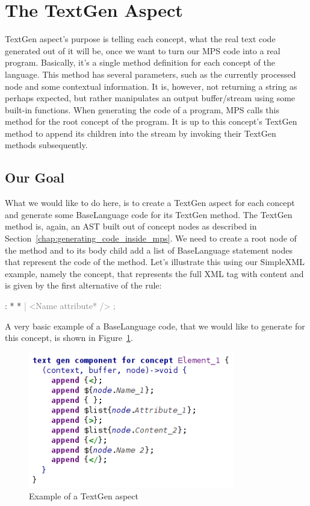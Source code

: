 \section{The TextGen Aspect}
\label{chap:textgen}

TextGen aspect's purpose is telling each concept, what the real text code generated out of it will be, once we want to turn our MPS code into a real program.
Basically, it's a single method definition for each concept of the language.
This method has several parameters, such as the currently processed node and some contextual information.
It is, however, not returning a string as perhaps expected, but rather manipulates an output buffer/stream using some built-in functions.
When generating the code of a program, MPS calls this method for the root concept of the program.
It is up to this concept's TextGen method to append its children into the stream by invoking their TextGen methods subsequently.

\subsection{Our Goal}

What we would like to do here, is to create a TextGen aspect for each concept and generate some BaseLanguage code for its TextGen method.
The TextGen method is, again, an AST built out of concept nodes as described in Section~\ref{chap:generating_code_inside_mps}.
We need to create a root node of the method and to its body child add a list of BaseLanguage statement nodes that represent the code of the method.
Let's illustrate this using our SimpleXML example, namely the  concept, that represents the full XML tag with content and is given by the first alternative of the  rule:

\begin{antlr}
	   :   \literal{<}  * \literal{>} * \literal{</}  \literal{>}
          \textcolor{gray}{|   \ap<\ap Name attribute* \ap/>\ap}
          \textcolor{gray}{;}
\end{antlr}

A very basic example of a BaseLanguage code, that we would like to generate for this concept, is shown in Figure~\ref{fig:textgen_example}.

\begin{figure}[h]
	\centering
	\includegraphics[width=90mm]{./img/textgen_example.png}
	\caption{Example of a TextGen aspect}
	\label{fig:textgen_example}
\end{figure}


